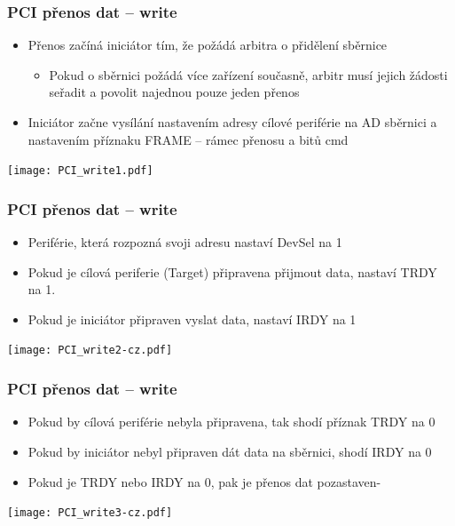 \documentclass{beamer}
\begin{document}
\begin{frame}
\frametitle{PCI přenos dat -- write}

\begin{itemize}
\item Přenos začíná iniciátor tím, že požádá arbitra o přidělení sběrnice
\begin{itemize}
\item Pokud o sběrnici požádá více zařízení současně, arbitr musí jejich žádosti seřadit a povolit najednou pouze jeden přenos
\end{itemize}
\item Iniciátor začne vysílání nastavením adresy cílové periférie na AD sběrnici a nastavením příznaku FRAME -- rámec přenosu a bitů cmd
\end{itemize}

\texttt{[image: PCI\_write1.pdf]}

\end{frame}

\begin{frame}
\frametitle{PCI přenos dat -- write}

\begin{itemize}
\item Periférie, která rozpozná svoji adresu nastaví DevSel na 1
\item Pokud je cílová periferie (Target) připravena přijmout data, nastaví TRDY na 1. 
\item Pokud je iniciátor připraven vyslat data, nastaví IRDY na 1
\end{itemize}

\texttt{[image: PCI\_write2-cz.pdf]}

\end{frame}


\begin{frame}
\frametitle{PCI přenos dat -- write}

\begin{itemize}
\item Pokud by cílová periférie nebyla připravena, tak shodí příznak TRDY na 0
\item Pokud by iniciátor nebyl připraven dát data na sběrnici, shodí IRDY na 0 
\item Pokud je TRDY nebo IRDY na 0, pak je přenos dat pozastaven-
\end{itemize}

\texttt{[image: PCI\_write3-cz.pdf]}

\end{frame}
\end{document}
